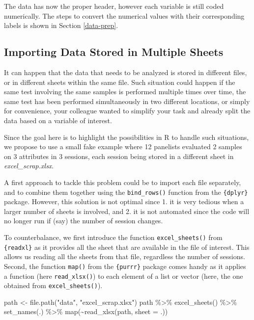 \documentclass[
]{book}
\newenvironment{Shaded}{\begin{snugshade}}{\end{snugshade}}
\newcommand{\AttributeTok}[1]{\textcolor[rgb]{0.77,0.63,0.00}{#1}}
\newcommand{\FunctionTok}[1]{\textcolor[rgb]{0.00,0.00,0.00}{#1}}
\newcommand{\NormalTok}[1]{#1}
\newcommand{\OtherTok}[1]{\textcolor[rgb]{0.56,0.35,0.01}{#1}}
\newcommand{\SpecialCharTok}[1]{\textcolor[rgb]{0.00,0.00,0.00}{#1}}
\newcommand{\StringTok}[1]{\textcolor[rgb]{0.31,0.60,0.02}{#1}}
\begin{document}
The data has now the proper header, however each variable is still coded numerically. The steps to convert the numerical values with their corresponding labels is shown in Section \ref{data-prep}.

\hypertarget{import-mult-sheet}{%
\subsection{Importing Data Stored in Multiple Sheets}\label{import-mult-sheet}}

It can happen that the data that needs to be analyzed is stored in different files, or in different sheets within the same file. Such situation could happen if the same test involving the same samples is performed multiple times over time, the same test has been performed simultaneously in two different locations, or simply for convenience, your colleague wanted to simplify your task and already split the data based on a variable of interest.

Since the goal here is to highlight the possibilities in R to handle such situations, we propose to use a small fake example where 12 panelists evaluated 2 samples on 3 attributes in 3 sessions, each session being stored in a different sheet in \emph{excel\_scrap.xlsx}.

A first approach to tackle this problem could be to import each file separately, and to combine them together using the \texttt{bind\_rows()} function from the \texttt{\{dplyr\}} package. However, this solution is not optimal since 1. it is very tedious when a larger number of sheets is involved, and 2. it is not automated since the code will no longer run if (say) the number of session changes.

To counterbalance, we first introduce the function \texttt{excel\_sheets()} from \texttt{\{readxl\}} as it provides all the sheet that are available in the file of interest. This allows us reading all the sheets from that file, regardless the number of sessions. Second, the function \texttt{map()} from the \texttt{\{purrr\}} package comes handy as it applies a function (here \texttt{read\_xlsx()}) to each element of a list or vector (here, the one obtained from \texttt{excel\_sheets()}).

\begin{Shaded}
\begin{Highlighting}[]
\NormalTok{path }\OtherTok{\textless{}{-}} \FunctionTok{file.path}\NormalTok{(}\StringTok{"data"}\NormalTok{, }\StringTok{"excel\_scrap.xlsx"}\NormalTok{) }
\NormalTok{path }\SpecialCharTok{\%\textgreater{}\%} 
  \FunctionTok{excel\_sheets}\NormalTok{() }\SpecialCharTok{\%\textgreater{}\%} 
  \FunctionTok{set\_names}\NormalTok{(.) }\SpecialCharTok{\%\textgreater{}\%} 
  \FunctionTok{map}\NormalTok{(}\SpecialCharTok{\textasciitilde{}}\FunctionTok{read\_xlsx}\NormalTok{(path, }\AttributeTok{sheet =}\NormalTok{ .))}
\end{Highlighting}
\end{Shaded}
\end{document}
